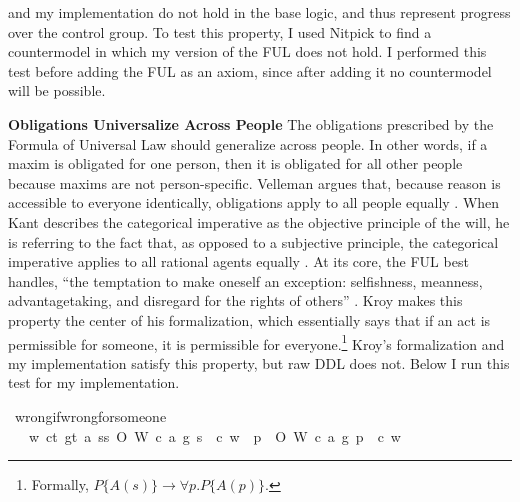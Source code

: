 \begin{isabellebody}
\begin{isamarkuptext}
and my implementation do not hold in the base logic, and thus represent progress over the control group.
To test this property, I used Nitpick to find a countermodel in which my version of the FUL does not hold. 
I performed this test before adding the FUL as an axiom, since after adding it no countermodel will
be possible.%
\end{isamarkuptext}\isamarkuptrue%
%
\begin{isamarkuptext}%
\medskip
\noindent \textbf{Obligations Universalize Across People} The obligations prescribed by the Formula of Universal Law
should generalize across people. In other words, if a maxim is obligated for one person, then it is obligated
for all other people because maxims are not person-specific. Velleman argues that, because 
reason is accessible to everyone identically, obligations apply to all people equally \citep[25]{velleman}. 
When Kant describes the categorical imperative as the objective principle of the will, he is referring 
to the fact that, as opposed to a subjective principle, the categorical imperative applies to all 
rational agents equally \citep[16]{groundwork}. At its core, the FUL best handles, ``the temptation 
to make oneself an exception: selfishness, meanness, advantagetaking, and disregard for the rights 
of others'' \citep[30]{KorsgaardFUL}. Kroy makes this property the center of his
formalization, which essentially says that if an act is permissible for someone, it is permissible for 
everyone.\footnote{Formally, $P\{A(s)\} \longrightarrow \forall p. P\{A(p)\}$.} Kroy's formalization and 
my implementation satisfy this property, but raw DDL does not. Below I run
this test for my implementation.%
\end{isamarkuptext}\isamarkuptrue%
\isamarkupfalse%
\ wrong{\isacharunderscore}if{\isacharunderscore}wrong{\isacharunderscore}for{\isacharunderscore}someone{\isacharcolon}\isanewline
\ \ \ {\isachardoublequoteopen}{\isasymforall}w{\isachardot}\ {\isasymforall}c{\isacharcolon}{\isacharcolon}t{\isachardot}\ {\isasymforall}g{\isacharcolon}{\isacharcolon}t{\isachardot}\ {\isasymforall}a{\isachardot}\ {\isasymexists}s{\isacharcolon}{\isacharcolon}s{\isachardot}\ O{\isacharbraceleft}\isactrlbold {\isasymnot}\ {\isacharparenleft}W\ {\isacharparenleft}c{\isacharcomma}\ a{\isacharcomma}\ g{\isacharparenright}\ s{\isacharparenright}\ {\isacharbar}\ c{\isacharbraceright}\ w\ {\isasymlongrightarrow}\ {\isacharparenleft}{\isasymforall}p{\isachardot}\ \ O{\isacharbraceleft}\isactrlbold {\isasymnot}\ {\isacharparenleft}W\ {\isacharparenleft}c{\isacharcomma}\ a{\isacharcomma}\ g{\isacharparenright}\ p{\isacharparenright}\ {\isacharbar}\ c{\isacharbraceright}\ w{\isacharparenright}\ {\isachardoublequoteclose}\isanewline

\end{isabellebody}

